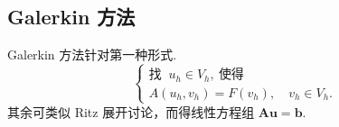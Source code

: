 \subsection{Galerkin 方法}

Galerkin 方法针对第一种形式.
\begin{equation*}
    \begin{cases}
        \text{找 }\ u_h \in V_h,\ \text{使得} \\
        A(u_h, v_h) = F(v_h), \quad v_h \in V_h.
    \end{cases}
\end{equation*}
其余可类似 Ritz 展开讨论，而得线性方程组 $\bm{A}\bm{u} = \bm{b}$.

